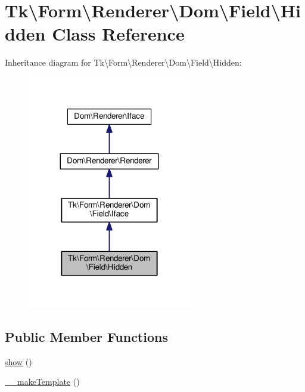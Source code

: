\hypertarget{classTk_1_1Form_1_1Renderer_1_1Dom_1_1Field_1_1Hidden}{\section{Tk\textbackslash{}Form\textbackslash{}Renderer\textbackslash{}Dom\textbackslash{}Field\textbackslash{}Hidden Class Reference}
\label{classTk_1_1Form_1_1Renderer_1_1Dom_1_1Field_1_1Hidden}
}


Inheritance diagram for Tk\textbackslash{}Form\textbackslash{}Renderer\textbackslash{}Dom\textbackslash{}Field\textbackslash{}Hidden\+:\nopagebreak
\begin{figure}[H]
\begin{center}
\leavevmode
\includegraphics[width=203pt]{classTk_1_1Form_1_1Renderer_1_1Dom_1_1Field_1_1Hidden__inherit__graph}
\end{center}
\end{figure}
\subsection*{Public Member Functions}
\begin{DoxyCompactItemize}
\item 
\hyperlink{classTk_1_1Form_1_1Renderer_1_1Dom_1_1Field_1_1Hidden_a482c59511558e1e4bdf83d943fc2800d}{show} ()
\item 
\hyperlink{classTk_1_1Form_1_1Renderer_1_1Dom_1_1Field_1_1Hidden_aabe13c78d33dd8ac012e61f28936e597}{\+\_\+\+\_\+make\+Template} ()
\end{DoxyCompactItemize}
